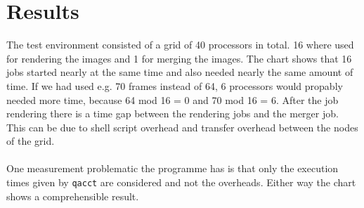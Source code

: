\documentclass{article}
\begin{document}
\section{Results}

The test environment consisted of a grid of 40 processors in total. 16 where used for rendering the images and 1 for merging the images. The chart shows that 16 jobs started nearly at the same time and also needed nearly the same amount of time. If we had used e.g. 70 frames instead of 64, 6 processors would propably needed more time, because 64 mod 16 = 0 and 70 mod 16 = 6. After the job rendering there is a time gap between the rendering jobs and the merger job. This can be due to shell script overhead and transfer overhead between the nodes of the grid.
\\
\\
One measurement problematic the programme has is that only the execution times given by \texttt{qacct} are considered and not the overheads. Either way the chart shows a comprehensible result.

%
%

\end{document}

